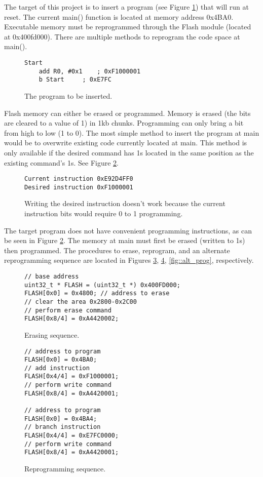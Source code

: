 The target of this project is to insert a program (see Figure \ref{fig::insert}) that will run at reset. The current main() function is located at memory address 0x4BA0. Executable memory must be reprogrammed through the Flash module (located at 0x400fd000). There are multiple methods to reprogram the code space at main(). 
	\begin{figure}[htbp]
		\begin{lstlisting}
Start
	add R0, #0x1 	; 0xF1000001
	b Start		; 0xE7FC
		\end{lstlisting}
		\caption{The program to be inserted. }\label{fig::insert}
	\end{figure}

Flash memory can either be erased or programmed. Memory is erased (the bits are cleared to a value of 1) in 1kb chunks. Programming can only bring a bit from high to low (1 to 0). The most simple method to insert the program at main would be to overwrite existing code currently located at main. This method is only available if the desired command has 1s located in the same position as the existing command's 1s. See Figure \ref{fig::ham}. 
	\begin{figure}[htbp]
		\begin{lstlisting}
Current instruction	0xE92D4FF0
Desired instruction	0xF1000001
		\end{lstlisting}
		\caption{Writing the desired instruction doesn't work because the current instruction bits would require 0 to 1 programming.  }\label{fig::ham}
	\end{figure}
The target program does not have convenient programming instructions, as can be seen in Figure \ref{fig::ham}. The memory at main must first be erased (written to 1s) then programmed. The procedures to erase, reprogram, and an alternate reprogramming sequence are located in Figures \ref{fig::erase}, \ref{fig::prog}, \ref{fig::alt_prog}, respectively. 
		\lstset{language=C} 
	\begin{figure}[htbp]
		\begin{lstlisting}
// base address
uint32_t * FLASH = (uint32_t *) 0x400FD000;
FLASH[0x0] = 0x4800; // address to erase
// clear the area 0x2800-0x2C00
// perform erase command
FLASH[0x8/4] = 0xA4420002; 
		\end{lstlisting}
		\caption{Erasing sequence. }\label{fig::erase}
	\end{figure}
	\begin{figure}[htbp]
		\begin{lstlisting}
// address to program
FLASH[0x0] = 0x4BA0; 
// add instruction
FLASH[0x4/4] = 0xF1000001; 
// perform write command
FLASH[0x8/4] = 0xA4420001; 

// address to program
FLASH[0x0] = 0x4BA4; 
// branch instruction
FLASH[0x4/4] = 0xE7FC0000; 
// perform write command
FLASH[0x8/4] = 0xA4420001; 
		\end{lstlisting}
		\caption{Reprogramming sequence. }\label{fig::prog}
	\end{figure}
